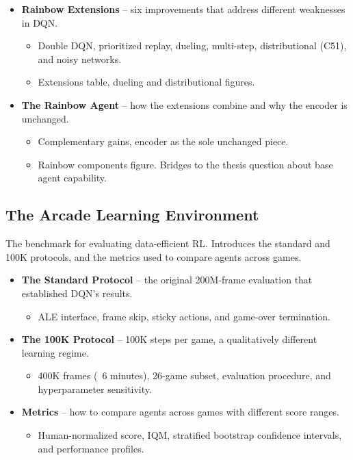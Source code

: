 \documentclass[11pt]{article}
\begin{document}
\begin{itemize}
\item \textbf{Rainbow Extensions} -- six improvements that address
  different weaknesses in DQN.
  \begin{itemize}[label=$\circ$, itemsep=0.2em, parsep=0pt, topsep=0pt, partopsep=0pt]
  \item Double DQN, prioritized replay, dueling, multi-step,
    distributional (C51), and noisy networks.
  \item Extensions table, dueling and distributional figures.
  \end{itemize}
\item \textbf{The Rainbow Agent} -- how the extensions combine and
  why the encoder is unchanged.
  \begin{itemize}[label=$\circ$, itemsep=0.2em, parsep=0pt, topsep=0pt, partopsep=0pt]
  \item Complementary gains, encoder as the sole unchanged piece.
  \item Rainbow components figure. Bridges to the thesis question
    about base agent capability.
  \end{itemize}
\end{itemize}

\subsection{The Arcade Learning Environment}

\noindent The benchmark for evaluating data-efficient RL. Introduces
the standard and 100K protocols, and the metrics used to compare
agents across games.

\begin{itemize}
\item \textbf{The Standard Protocol} -- the original 200M-frame
  evaluation that established DQN's results.
  \begin{itemize}[label=$\circ$, itemsep=0.2em, parsep=0pt, topsep=0pt, partopsep=0pt]
  \item ALE interface, frame skip, sticky actions, and game-over
    termination.
  \end{itemize}
\item \textbf{The 100K Protocol} -- 100K steps per game, a
  qualitatively different learning regime.
  \begin{itemize}[label=$\circ$, itemsep=0.2em, parsep=0pt, topsep=0pt, partopsep=0pt]
  \item 400K frames (~6 minutes), 26-game subset, evaluation
    procedure, and hyperparameter sensitivity.
  \end{itemize}
\item \textbf{Metrics} -- how to compare agents across games with
  different score ranges.
  \begin{itemize}[label=$\circ$, itemsep=0.2em, parsep=0pt, topsep=0pt, partopsep=0pt]
  \item Human-normalized score, IQM, stratified bootstrap
    confidence intervals, and performance profiles.
  \end{itemize}
\end{itemize}
\end{document}
